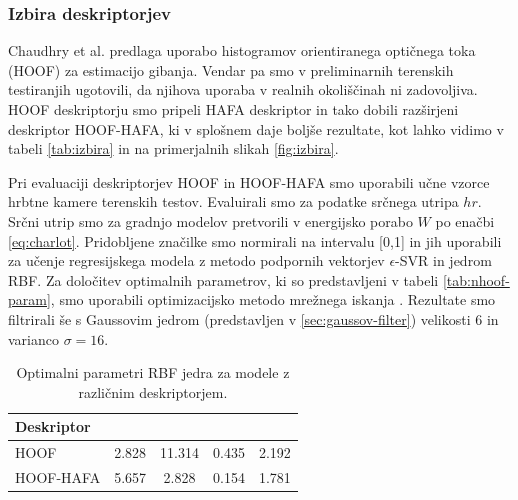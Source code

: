 \subsubsection{Izbira deskriptorjev}

Chaudhry et al. \cite{chaudhry2009histograms} predlaga uporabo histogramov orientiranega optičnega toka (HOOF) za estimacijo gibanja. Vendar pa smo v preliminarnih terenskih testiranjih \cite{koporec2017observation} ugotovili, da njihova uporaba v realnih okoliščinah ni zadovoljiva. HOOF deskriptorju smo pripeli HAFA deskriptor in tako dobili razširjeni deskriptor HOOF-HAFA, ki v splošnem daje boljše rezultate, kot lahko vidimo v tabeli \ref{tab:izbira} in na primerjalnih slikah \ref{fig:izbira}.

Pri evaluaciji deskriptorjev HOOF in HOOF-HAFA smo uporabili učne vzorce hrbtne kamere terenskih testov. Evaluirali smo za podatke srčnega utripa $hr$. Srčni utrip smo za gradnjo modelov pretvorili v energijsko porabo $W$ po enačbi \eqref{eq:charlot}. Pridobljene značilke smo normirali na intervalu [0,1] in jih uporabili za učenje regresijskega modela z metodo podpornih vektorjev $\epsilon$-SVR in jedrom RBF. Za določitev optimalnih parametrov, ki so predstavljeni v tabeli \ref{tab:nhoof-param}, smo uporabili optimizacijsko metodo mrežnega iskanja \cite{hsu2003practical}. Rezultate smo filtrirali še s Gaussovim jedrom (predstavljen v \ref{sec:gaussov-filter}) velikosti $6$ in varianco $\sigma=16$. 

\begin{table}[htb]
	\centering
    \begin{tabular}{l S[table-format=2.3] S[table-format=1.3] S[table-format=1.3] S[table-format=1.3]}
    \toprule
    \textbf{Deskriptor} &  & \thead{$\mathbf{\gamma}$} & \thead{$\mathbf{\epsilon}$} &  \\ 
    \midrule
    HOOF & 2.828 & 11.314 & 0.435 & 2.192 \\
    HOOF-HAFA & 5.657 & 2.828 & 0.154 & 1.781 \\
    \bottomrule
    \end{tabular}
    \caption[Optimalni parameteri RBF jedra modelov za izbiro deskriptorjev]{Optimalni parametri RBF jedra za modele z različnim deskriptorjem.}
    \label{tab:izbira-param}
\end{table}


